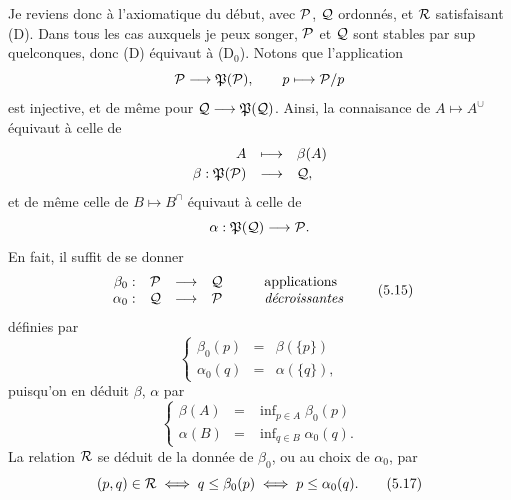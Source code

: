 Je reviens donc à l'axiomatique du début, avec $\mathcal{P}$, $\mathcal{Q}$ ordonnés, et $\mathcal{R}$ satisfaisant (D). Dans tous les cas auxquels je peux songer, $\mathcal{P}$ et $\mathcal{Q}$ sont stables par sup quelconques, donc (D) équivaut à (D$_0$). Notons que l'application
\[
\mathcal{P} \longrightarrow \mathfrak{P}(\mathcal{P}), \qquad p \longmapsto \mathcal{P}/p
\]
est injective, et de même pour $\mathcal{Q} \longrightarrow \mathfrak{P}(\mathcal{Q})$. Ainsi, la connaisance de $A \longmapsto A^{\cup}$ équivaut à celle de %
\[
\begin{array}{rcl}
A & \longmapsto & \beta(A)\\[0.5ex]
\beta : \mathfrak{P}(\mathcal{P}) & \longrightarrow & \mathcal{Q},
\end{array}
\]
et de même celle de $B \longmapsto B^{\cap}$ équivaut à
celle de
\[
\alpha : \mathfrak{P}(\mathcal{Q}) \longrightarrow \mathcal{P}.
\]
En fait, il suffit de se donner
\[
\begin{array}{rcccl}
\beta_0 : & \mathcal{P} & \longrightarrow & \mathcal{Q} & \qquad \text{applications}\\
\alpha_0 : & \mathcal{Q} & \longrightarrow & \mathcal{P} & \qquad \textit{décroissantes}
\end{array}
\tag*{(5.15)}
\]
définies par
\[
\left\{
\begin{array}{rcl}
\beta_0(p) & = & \beta(\{p\})\\[1ex]
\alpha_0(q) & = & \alpha(\{q\}),
\end{array}
\right.
\]
puisqu'on en déduit $\beta$, $\alpha$ par
\[
\left\{
\begin{array}{rcl}
\beta(A) & = & \inf\nolimits_{p \in A} \beta_0(p)\\[1ex]
\alpha(B) & = & \inf\nolimits_{q \in B} \alpha_0(q).
\end{array}
\right.
\tag*{(5.16)}
\]
La relation $\mathcal{R}$ se déduit de la donnée de $\beta_0$, ou au choix de $\alpha_0$, par
\[
(p,q) \in \mathcal{R} \iff q \leq \beta_0(p) \iff p \leq \alpha_0(q).
\tag*{(5.17)}
\]


